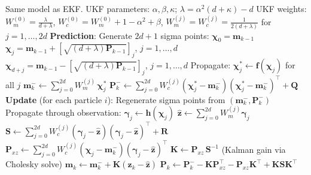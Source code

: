 \documentclass{article}
\begin{document}
\begin{algorithm}[H]
\caption{Unscented Kalman Filter (UKF)}
\begin{algorithmic}[1]
\REQUIRE Same model as EKF. UKF parameters: $\alpha, \beta, \kappa$; $\lambda = \alpha^2(d+\kappa)-d$
\REQUIRE UKF weights: $W_m^{(0)} = \frac{\lambda}{d+\lambda}$, $W_c^{(0)} = W_m^{(0)} + 1 - \alpha^2 + \beta$, $W_m^{(j)} = W_c^{(j)} = \frac{1}{2(d+\lambda)}$ for $j=1,\ldots,2d$
  \STATE \textbf{Prediction}:
  \STATE Generate $2d+1$ sigma points: $\boldsymbol{\chi}_0 = \mathbf{m}_{k-1}$
  \STATE $\boldsymbol{\chi}_j = \mathbf{m}_{k-1} + \left[\sqrt{(d+\lambda)\mathbf{P}_{k-1}}\right]_j$, \quad $j=1,\ldots,d$
  \STATE $\boldsymbol{\chi}_{d+j} = \mathbf{m}_{k-1} - \left[\sqrt{(d+\lambda)\mathbf{P}_{k-1}}\right]_j$, \quad $j=1,\ldots,d$
  \STATE Propagate: $\boldsymbol{\chi}_j^{*} \leftarrow \mathbf{f}(\boldsymbol{\chi}_j)$ for all $j$
  \STATE $\mathbf{m}_k^{-} \leftarrow \sum_{j=0}^{2d} W_m^{(j)}\, \boldsymbol{\chi}_j^{*}$
  \STATE $\mathbf{P}_k^{-} \leftarrow \sum_{j=0}^{2d} W_c^{(j)} (\boldsymbol{\chi}_j^{*} - \mathbf{m}_k^{-})(\boldsymbol{\chi}_j^{*} - \mathbf{m}_k^{-})^\top + \mathbf{Q}$
  \STATE \textbf{Update} (for each particle $i$):
  \STATE Regenerate sigma points from $(\mathbf{m}_k^{-}, \mathbf{P}_k^{-})$
  \STATE Propagate through observation: $\boldsymbol{\gamma}_j \leftarrow \mathbf{h}(\boldsymbol{\chi}_j)$
  \STATE $\hat{\mathbf{z}} \leftarrow \sum_{j=0}^{2d} W_m^{(j)} \boldsymbol{\gamma}_j$
  \STATE $\mathbf{S} \leftarrow \sum_{j=0}^{2d} W_c^{(j)} (\boldsymbol{\gamma}_j - \hat{\mathbf{z}})(\boldsymbol{\gamma}_j - \hat{\mathbf{z}})^\top + \mathbf{R}$
  \STATE $\mathbf{P}_{xz} \leftarrow \sum_{j=0}^{2d} W_c^{(j)} (\boldsymbol{\chi}_j - \mathbf{m}_k^{-})(\boldsymbol{\gamma}_j - \hat{\mathbf{z}})^\top$
  \STATE $\mathbf{K} \leftarrow \mathbf{P}_{xz}\,\mathbf{S}^{-1}$ \hfill (Kalman gain via Cholesky solve)
  \STATE $\mathbf{m}_k \leftarrow \mathbf{m}_k^{-} + \mathbf{K}(\mathbf{z}_k - \hat{\mathbf{z}})$
  \STATE $\mathbf{P}_k \leftarrow \mathbf{P}_k^{-} - \mathbf{K}\mathbf{P}_{xz}^{\top} - \mathbf{P}_{xz}\mathbf{K}^{\top} + \mathbf{K}\mathbf{S}\mathbf{K}^{\top}$
\ENDFOR
\end{algorithmic}
\end{algorithm}
\end{document}
